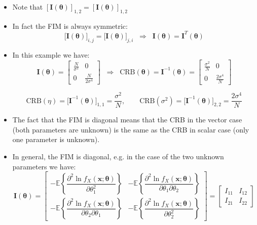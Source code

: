 \begin{itemize}
$$
\big[\mathbf{I}(\boldsymbol{\theta})\big]_{2,1}
=-\mathbb{E}\!\left\{\frac{\partial^{2}\,\ln f_{X}(\mathbf{x};\boldsymbol{\theta})}{\partial \theta_{2}\partial \theta_{1}}\right\}
=-\mathbb{E}\!\left\{-\frac{1}{\sigma^{4}}\sum_{i=1}^{N}(X_{i}-\eta)\right\}=0
$$
    \item Note that \([\mathbf{I}(\boldsymbol{\theta})]_{1,2}=[\textbf{I}(\boldsymbol{\theta})]_{1,2}\)
    \item In fact the FIM is always symmetric: 
    $$
    \big[\mathbf{I}(\boldsymbol{\theta})\big]_{i,j}
    =\big[\mathbf{I}(\boldsymbol{\theta})\big]_{j,i}
    \;\;\Longrightarrow\;\;
    \mathbf{I}(\boldsymbol{\theta})=\mathbf{I}^{T}(\boldsymbol{\theta})
    $$
    \item In this example we have:
    $$
\mathbf{I}(\boldsymbol{\theta})
=\begin{bmatrix}
\frac{N}{\sigma^{2}} & 0\\[4pt]
0 & \frac{N}{2\sigma^{4}}
\end{bmatrix}
\;\;\Longrightarrow\;\;
\mathrm{CRB}(\boldsymbol{\theta})
=\mathbf{I}^{-1}(\boldsymbol{\theta})
=\begin{bmatrix}
\frac{\sigma^{2}}{N} & 0\\[4pt]
0 & \frac{2\sigma^{4}}{N}
\end{bmatrix}
$$ 

$$
\mathrm{CRB}(\eta)=\big[\mathbf{I}^{-1}(\boldsymbol{\theta})\big]_{1,1}=\frac{\sigma^{2}}{N},
\qquad
\mathrm{CRB}(\sigma^{2})=\big[\mathbf{I}^{-1}(\boldsymbol{\theta})\big]_{2,2}=\frac{2\sigma^{4}}{N}
$$

    \item The fact that the FIM is diagonal means that the CRB in the vector case (both parameters are unknown) is the same as the CRB in scalar case (only one parameter is unknown).
    \item In general, the FIM is diagonal, e.g. in the case of the two unknown parameters we have:
    $$
    \mathbf{I}(\boldsymbol{\theta})
    =\begin{bmatrix}
    -\mathbb{E}\!\left\{\dfrac{\partial^{2}\ln f_{X}(\mathbf{x};\boldsymbol{\theta})}{\partial \theta_{1}^{2}}\right\}
    &
    -\mathbb{E}\!\left\{\dfrac{\partial^{2}\ln f_{X}(\mathbf{x};\boldsymbol{\theta})}{\partial \theta_{1}\partial \theta_{2}}\right\}
    \\[10pt]
    -\mathbb{E}\!\left\{\dfrac{\partial^{2}\ln f_{X}(\mathbf{x};\boldsymbol{\theta})}{\partial \theta_{2}\partial \theta_{1}}\right\}
    &
    -\mathbb{E}\!\left\{\dfrac{\partial^{2}\ln f_{X}(\mathbf{x};\boldsymbol{\theta})}{\partial \theta_{2}^{2}}\right\}
    \end{bmatrix}
    =\begin{bmatrix}
    I_{11} & I_{12}\\
    I_{21} & I_{22}
    \end{bmatrix}
    $$ 


\end{itemize}
